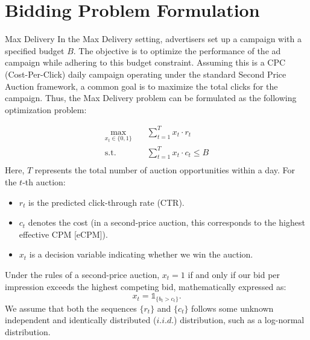 \documentclass[../main.tex]{subfiles}
\begin{document}
	\chapter{Bidding Problem Formulation}
	
	
	\begin{section}{Max Delivery} \label{sec:md_optimal}
	In the Max Delivery setting, advertisers set up a campaign with a specified budget \(B\). The objective is to optimize the performance of the ad campaign while adhering to this budget constraint. Assuming this is a CPC (Cost-Per-Click) daily campaign operating under the standard Second Price Auction framework, a common goal is to maximize the total clicks for the campaign. Thus, the Max Delivery problem can be formulated as the following optimization problem:
	
	
		\begin{equation}  \label{eq:max_delivery}
			\begin{aligned}
				\max_{x_t \in \{0,1\}} \quad & \sum_{t=1}^T x_t \cdot r_t \\
				\text{s.t.} \quad &  \sum_{t=1}^{T} x_t \cdot c_t \leq B \\
			\end{aligned}
		\end{equation}
	Here, \(T\) represents the total number of auction opportunities within a day. For the \(t\)-th auction:
	\begin{itemize}
		\item \(r_t\) is the predicted click-through rate (CTR).
		\item \(c_t\) denotes the cost (in a second-price auction, this corresponds to the highest effective CPM [eCPM]).
		\item \(x_t\) is a decision variable indicating whether we win the auction.
	\end{itemize}
	Under the rules of a second-price auction, \(x_t = 1\) if and only if our bid per impression exceeds the highest competing bid, mathematically expressed as:
	\[
	x_t = \mathds{1}_{ \{b_t > c_t \}}.
	\]
	We assume that both the sequences \(\{r_t\}\)  and \(\{c_t\}\) follows some unknown independent and identically distributed (\(i.i.d.\)) distribution, such as a log-normal distribution.
	

\end{section}
\end{document}
